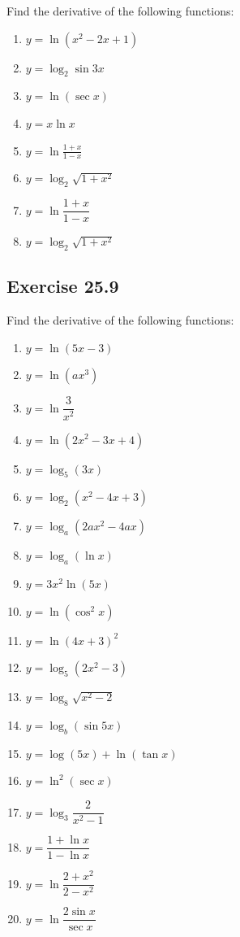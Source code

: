 \documentclass[12pt]{report}
\begin{document}
Find the derivative of the following functions: \setlength{\columnseprule}{1pt}
\setlength{\columnsep}{24pt}
\begin{multicols}{2}
  \begin{enumerate}
    \item $y=\ln\left(x^{2}-2x+1\right)$
    \item $y=\log_{2}\sin3x$
    \item $y=\ln(\sec x)$
    \item $y=x\ln x$
    \item $y=\ln{\frac{1+x}{1-x}}$
    \item $y=\log_{2}{\sqrt{1+x^{2}}}$
    \item $y=\ln{\dfrac{1+x}{1-x}}$
    \item $y=\log_{2}{\sqrt{1+x^{2}}}$
  \end{enumerate}
\end{multicols}

\subsection*{Exercise 25.9}

Find the derivative of the following functions: \setlength{\columnseprule}{1pt}
\setlength{\columnsep}{24pt}
\begin{multicols}{2}
  \begin{enumerate}
    \item $y=\ln\left(5x-3\right)$
    \item $y=\ln\left(a x^{3}\right)$
    \item $y=\ln{\dfrac{3}{x^{2}}}$
    \item $y=\ln\left(2x^{2}-3x+4\right)$
    \item $y=\log_{5}(3x)$
    \item $y=\log_{2}\left(x^{2}-4x\!+\!3\right)$
    \item $y=\log_{a}\left(2a x^{2}-4a x\right)$
    \item $y=\log_{a}\left(\ln x\right)$
    \item $y=3x^{2}\ln\left(5x\right)$
    \item $y=\ln\left(\cos^{2}x\right)$
    \item $y=\ln{(4x+3)}^{2}$
    \item $y=\log_{5}\left(2x^{2}-3\right)$
    \item $y=\log_{8}{\sqrt{x^{2}-2}}$
    \item $y=\log_{b}(\sin5x)$
    \item $y=\log{(5x)}+\ln{(\tan{x})}$
    \item $y=\ln^{2}(\sec x)$
    \item $y=\log_{3}{\dfrac{2}{x^{2}-1}}$
    \item $y={\dfrac{1+\ln x}{1-\ln x}}$
    \item $y=\ln{\dfrac{2+x^{2}}{2-x^{2}}}$
    \item $y=\ln{\dfrac{2\sin x}{\sec x}}$
  \end{enumerate}
\end{multicols}
\end{document}

